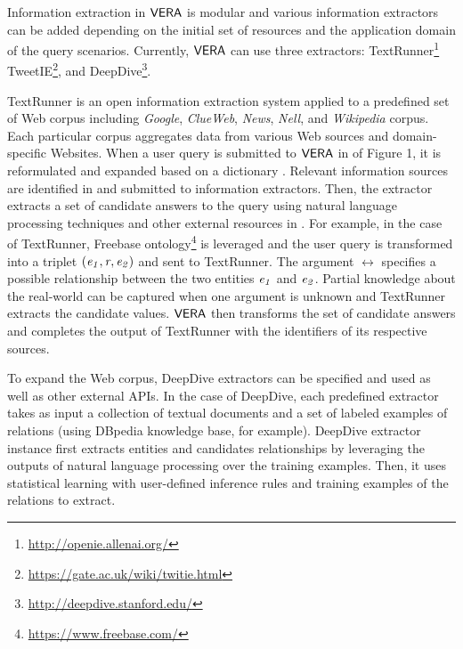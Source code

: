 Information extraction in $\mathsf{VERA}$ is modular and  various information extractors can be added depending on the initial set of resources  and the application domain of the query scenarios. Currently, $\mathsf{VERA}$ can use three  extractors: TextRunner\footnote{\scriptsize{\url{http://openie.allenai.org/}}}
TweetIE\footnote{\scriptsize{\url{https://gate.ac.uk/wiki/twitie.html}}}, and 
DeepDive\footnote{\scriptsize{\url{http://deepdive.stanford.edu/}}}.

TextRunner is an open information extraction system applied to a predefined set of Web corpus including \emph{Google}, \emph{ClueWeb}, \emph{News}, \emph{Nell}, and 
\emph{Wikipedia} corpus. Each particular corpus aggregates data from various  
 Web sources and domain-specific Websites.  When a user query is submitted to $\mathsf{VERA}$ in  of Figure 1, it is reformulated and expanded based on a dictionary . Relevant information sources are identified in   and submitted to information extractors. Then, the extractor extracts a set of candidate answers to the query using natural language processing techniques and other external resources in . For example, in the case of TextRunner, Freebase ontology\footnote{\scriptsize{\url{https://www.freebase.com/}}} is leveraged and the user query is transformed into a triplet $(\mathit{e_{1}}, \mathit{r}_{}, \mathit{e_{2}})$ and sent to TextRunner. The argument $\rel{}$  specifies a possible relationship between the two entities $\mathit{e_{1}}$ and $\mathit{e_{2}}$. 
Partial knowledge about the real-world can be captured when  one  argument is unknown and TextRunner extracts  the candidate values.  $\mathsf{VERA}$ then transforms the set of candidate answers and completes the output of TextRunner with the identifiers of its respective sources. 

To expand the Web corpus,  DeepDive extractors can be specified and used as well as other external APIs. %
In the case of DeepDive, each predefined extractor takes as input a collection of textual documents and a set of labeled examples of relations (using DBpedia knowledge base, for example). DeepDive extractor instance first extracts entities and candidates relationships by leveraging the outputs of natural language processing over the training examples. Then, it uses statistical learning with  user-defined inference rules and training examples of the relations to extract.
 
